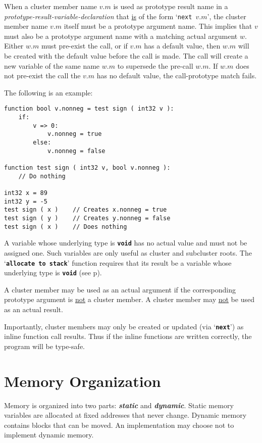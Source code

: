 \documentclass[12pt]{article}
\newcommand{\TT}[1]{{\tt \bfseries #1}}
\newcommand{\key}[1]{{\bf \em #1}\index{#1}}
\newcommand{\pagref}[1]{p\pageref{#1}}
\newenvironment{indpar}[1][0.3in]%
	{\begin{list}{}%
		     {\setlength{\itemsep}{0in}%
		      \setlength{\topsep}{0in}%
		      \setlength{\parsep}{1ex}%
		      \setlength{\labelwidth}{#1}%
		      \setlength{\leftmargin}{#1}%
		      \addtolength{\leftmargin}{\labelsep}}%
	 \item}%
	{\end{list}}
\begin{document}
When a cluster member name $v.m$ is used as prototype result name in
a {\em prototype-result-variable-declaration} that \underline{is}
of the form `{\tt next $v.m$}', the cluster member name $v.m$ itself
must be a prototype argument name.  This implies that $v$ must also
be a prototype argument name with a matching actual argument $w$.
Either $w.m$ must pre-exist the call, or if $v.m$ has a default
value, then $w.m$ will be created with the default value before
the call is made.  The call will create a new variable of the
same name $w.m$ to supersede the pre-call $w.m$.
If $w.m$ does not pre-exist the call the $v.m$ has no default
value, the call-prototype match fails.

The following is an example:
\begin{indpar}\begin{verbatim}
function bool v.nonneg = test sign ( int32 v ):
    if:
        v => 0:
            v.nonneg = true
        else:
            v.nonneg = false

function test sign ( int32 v, bool v.nonneg ):
    // Do nothing

int32 x = 89
int32 y = -5
test sign ( x )    // Creates x.nonneg = true
test sign ( y )    // Creates y.nonneg = false
test sign ( x )    // Does nothing
\end{verbatim}\end{indpar}

A variable whose underlying type is \TT{void} has no actual value
and must not be assigned one.  Such variables are only useful
as cluster and subcluster roots.  The `\TT{allocate to stack}'
function requires that its result be a variable whose underlying
type is \TT{void} (see \pagref{ALLOCATE-TO-STACK}).

A cluster member may be used as an actual argument if
the corresponding prototype argument is
\underline{not} a cluster member.  A cluster member may \underline{not}
be used as an actual result.

Importantly, cluster members may only be created or updated
(via `\TT{next}')
as inline function call results.  Thus if
the inline functions are written correctly, the program will be type-safe.

\section{Memory Organization}
\label{MEMORY-ORGANIZATION}

Memory is organized into two parts: \key{static} and \key{dynamic}.
Static memory variables are allocated at fixed addresses
that never change.  Dynamic memory contains blocks that
can be moved.  An implementation may choose not to implement dynamic
memory.
\end{document}

